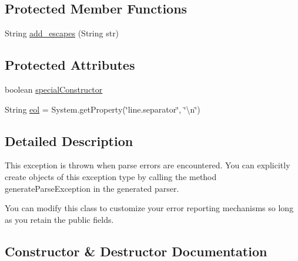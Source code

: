 \subsection*{Protected Member Functions}
\begin{DoxyCompactItemize}
\item 
String \mbox{\hyperlink{classanalizadores_1_1_parse_exception_ad9fe07877080d0a28daa4d139860d110}{add\+\_\+escapes}} (String str)
\end{DoxyCompactItemize}
\subsection*{Protected Attributes}
\begin{DoxyCompactItemize}
\item 
boolean \mbox{\hyperlink{classanalizadores_1_1_parse_exception_a24ccd87a4ef257c9e62418a4009bc5cd}{special\+Constructor}}
\item 
String \mbox{\hyperlink{classanalizadores_1_1_parse_exception_a6dceb2e8353ece2d7d2e2b86a8c7147d}{eol}} = System.\+get\+Property(\char`\"{}line.\+separator\char`\"{}, \char`\"{}\textbackslash{}n\char`\"{})
\end{DoxyCompactItemize}


\subsection{Detailed Description}
This exception is thrown when parse errors are encountered. You can explicitly create objects of this exception type by calling the method generate\+Parse\+Exception in the generated parser.

You can modify this class to customize your error reporting mechanisms so long as you retain the public fields. 

\subsection{Constructor \& Destructor Documentation}
\mbox{\label{classanalizadores_1_1_parse_exception_ac9289cbed3fc5347a25e1727070311e9}} 
